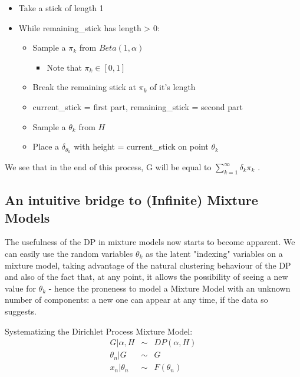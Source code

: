 \documentclass[11pt]{article}
\begin{document}
	\begin{itemize}
		\item
		Take a stick of length 1\\
		\item
		While remaining\_stick has length \textgreater{} 0:
		
		\begin{itemize}
			\item
			Sample a \(\pi_k\) from \(Beta(1,\alpha)\)
			
			\begin{itemize}
				\item
				Note that \(\pi_k \in [0,1]\)
			\end{itemize}
			\item
			Break the remaining stick at \(\pi_k\) of it's length\\
			\item
			current\_stick = first part, remaining\_stick = second part\\
			\item
			Sample a \(\theta_k\) from \(H\)
			\item
			Place a \(\delta_{\theta_k}\) with height = current\_stick on point
			\(\theta_k\)
		\end{itemize}
	\end{itemize}
	
We see that in the end of this process, G will be equal to \(\sum_{k=1}^\infty \delta_k \pi_k\) .
	
\subsection{An intuitive bridge to (Infinite) Mixture Models}\label{an-intuitive-bridge-to-infinite-mixture-models}
	
The usefulness of the DP in mixture models now starts to become
apparent. We can easily use the random variables \(\theta_k\) as the
latent "indexing" variables on a mixture model, taking advantage of the
natural clustering behaviour of the DP and also of the fact that, at any
point, it allows the possibility of seeing a new value for \(\theta_k\)
- hence the proneness to model a Mixture Model with an unknown number of
components: a new one can appear at any time, if the data so suggests.
	
Systematizing the Dirichlet Process Mixture Model: 
\begin{eqnarray}
	G|\alpha, H &\sim& DP(\alpha, H) \nonumber \\
	\theta_n|G &\sim& G \nonumber \\
	x_n|\theta_n &\sim& F(\theta_n) \nonumber
\end{eqnarray}
	
\end{document}
